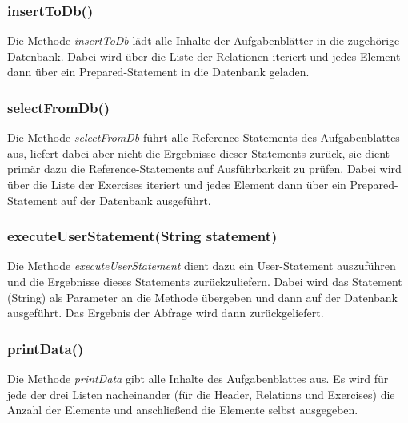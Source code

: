 \documentclass[11pt]{report}
\begin{document}
\subsubsection*{insertToDb()}

Die Methode \textit{insertToDb} lädt alle Inhalte der Aufgabenblätter in die zugehörige Datenbank. 
Dabei wird über die Liste der Relationen iteriert und jedes Element dann über ein Prepared-Statement in die Datenbank geladen.

\subsubsection*{selectFromDb()}

Die Methode \textit{selectFromDb} führt alle Reference-Statements des Aufgabenblattes aus, liefert dabei aber nicht die Ergebnisse dieser Statements zurück, sie dient primär dazu die Reference-Statements auf Ausführbarkeit zu prüfen.
Dabei wird über die Liste der Exercises iteriert und jedes Element dann über ein Prepared-Statement auf der Datenbank ausgeführt.

\subsubsection*{executeUserStatement(String statement)}

Die Methode \textit{executeUserStatement} dient dazu ein User-Statement auszuführen und die Ergebnisse dieses Statements zurückzuliefern.
Dabei wird das Statement (String) als Parameter an die Methode übergeben und dann auf der Datenbank ausgeführt. Das Ergebnis der Abfrage wird dann zurückgeliefert.

\subsubsection*{printData()}

Die Methode \textit{printData} gibt alle Inhalte des Aufgabenblattes aus.
Es wird für jede der drei Listen nacheinander (für die Header, Relations und Exercises) die Anzahl der Elemente und anschließend die Elemente selbst ausgegeben.
\end{document}
